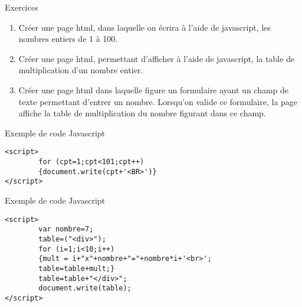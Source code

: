 \documentclass[10pt]{beamer}
\begin{document}
\begin{frame}[fragile]
\mframe{\JS}
\begin{exampleblock}{Exercices}
\begin{enumerate}
\item<2-> Créer une page {\sc html}, dans laquelle on écrira à l'aide de javascript, les nombres entiers de 1 à 100.
\item<3-> Créer une page {\sc html}, permettant d'afficher à l'aide de javascript, la table de multiplication d'un nombre entier.
\item<4-> Créer une page {\sc html} dans laquelle figure un formulaire ayant un champ de texte permettant d'entrer un nombre. Lorsqu'on valide ce formulaire, la page affiche la table de multiplication du nombre figurant dans ce champ.
\end{enumerate}
\end{exampleblock}
\end{frame}

\begin{frame}[fragile]
\mframe{\JS}
\begin{exampleblock}{Exemple de code Javascript}
\begin{center}
\begin{lstlisting}
<script>
        for (cpt=1;cpt<101;cpt++) 
        {document.write(cpt+'<BR>')}
</script>
\end{lstlisting}
\end{center}
\end{exampleblock}
\end{frame}

\begin{frame}[fragile]
\mframe{\JS}
\begin{exampleblock}{Exemple de code Javascript}
\begin{center}
\begin{lstlisting}
<script>
        var nombre=7;
        table=("<div>");
        for (i=1;i<10;i++)
        {mult = i+"x"+nombre+"="+nombre*i+'<br>';
        table=table+mult;}
        table=table+"</div>";
        document.write(table);
</script>
\end{lstlisting}
\end{center}
\end{exampleblock}
\end{frame}
\end{document}
